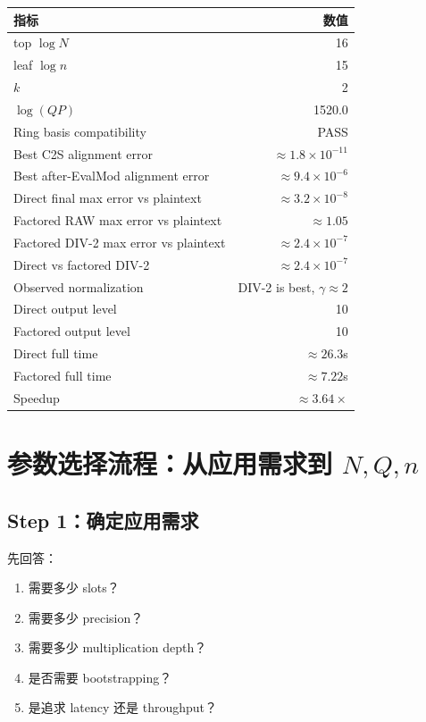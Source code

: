 \documentclass[UTF8,11pt,a4paper]{ctexart}
\begin{document}
\begin{center}
\begin{tabular}{lr}
\toprule
指标 & 数值 \\
\midrule
top $\log N$ & 16 \\
leaf $\log n$ & 15 \\
$k$ & 2 \\
$\log(QP)$ & 1520.0 \\
Ring basis compatibility & PASS \\
Best C2S alignment error & $\approx 1.8\times 10^{-11}$ \\
Best after-EvalMod alignment error & $\approx 9.4\times 10^{-6}$ \\
Direct final max error vs plaintext & $\approx 3.2\times 10^{-8}$ \\
Factored RAW max error vs plaintext & $\approx 1.05$ \\
Factored DIV-2 max error vs plaintext & $\approx 2.4\times 10^{-7}$ \\
Direct vs factored DIV-2 & $\approx 2.4\times 10^{-7}$ \\
Observed normalization & DIV-2 is best, $\gamma\approx 2$ \\
Direct output level & 10 \\
Factored output level & 10 \\
Direct full time & $\approx 26.3$s \\
Factored full time & $\approx 7.22$s \\
Speedup & $\approx 3.64\times$ \\
\bottomrule
\end{tabular}
\end{center}

\section{参数选择流程：从应用需求到 $N,Q,n$}

\subsection{Step 1：确定应用需求}

先回答：

\begin{enumerate}[leftmargin=2em]
    \item 需要多少 slots？
    \item 需要多少 precision？
    \item 需要多少 multiplication depth？
    \item 是否需要 bootstrapping？
    \item 是追求 latency 还是 throughput？
\end{enumerate}
\end{document}
